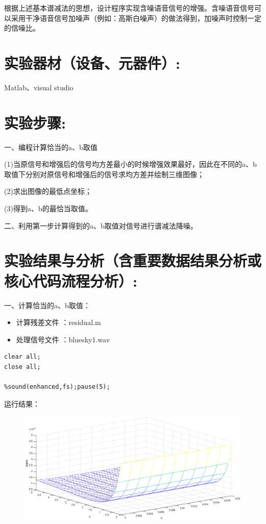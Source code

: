 \documentclass[a4paper,11pt,UTF8]{ctexart}
\newcommand{\bottomcaption}{%
\setlength{\abovecaptionskip}{6pt}%
\setlength{\belowcaptionskip}{6pt}%
\caption}
\newcommand{\xiaowuhao}{\fontsize{9pt}{\baselineskip}\selectfont}   %
\begin{document}
根据上述基本谱减法的思想，设计程序实现含噪语音信号的增强。含噪语音信号可以采用干净语音信号加噪声（例如：高斯白噪声）的做法得到，加噪声时控制一定的信噪比。

\section{实验器材（设备、元器件）:}

Matlab、visual studio

\section{实验步骤:}

一、编程计算恰当的a、b取值\par 
(1)当原信号和增强后的信号均方差最小的时候增强效果最好，因此在不同的a、b取值下分别对原信号和增强后的信号求均方差并绘制三维图像；\par 
(2)求出图像的最低点坐标；\par 
(3)得到a、b的最恰当取值。\par 

二、利用第一步计算得到的a、b取值对信号进行谱减法降噪。


\section{实验结果与分析（含重要数据结果分析或核心代码流程分析）:}
一、计算恰当的a、b取值：
\begin{itemize}
	\item 计算残差文件 ：residual.m
	\item 处理信号文件 ：bluesky1.wav
\end{itemize}

\begin{lstlisting}[caption={计算恰当的a、b取值},captionpos=b]
clear all;
close all;

%sound(enhanced,fs);pause(5);

\end{lstlisting}

运行结果：\par
\begin{figure}[!htbp]
	\centering
	\includegraphics[width=\textwidth]{residual.eps}
	\bottomcaption{\xiaowuhao{不同a、b下的均方差}}
\end{figure}
\end{document}
